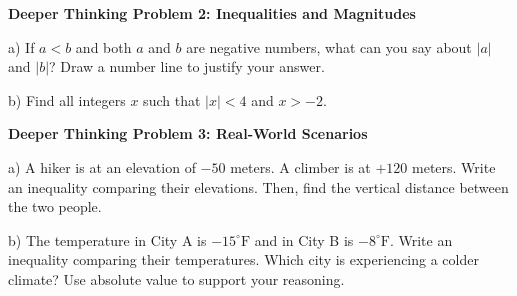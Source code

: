 \documentclass[12pt, letterpaper, fleqn]{article}
\begin{document}
\vspace{4mm}

\begin{tcolorbox}[colback=white, colframe=black, boxrule=1pt, arc=4mm, left=6mm, right=6mm, top=5mm, bottom=5mm]
\textbf{Deeper Thinking Problem 2: Inequalities and Magnitudes}

\medskip

\noindent
a) If $a < b$ and both $a$ and $b$ are negative numbers, what can you say about $|a|$ and $|b|$? Draw a number line to justify your answer.

\vspace{2.5cm}

\noindent
b) Find all integers $x$ such that $|x| < 4$ and $x > -2$.

\vspace{2cm}
\end{tcolorbox}


\begin{tcolorbox}[colback=white, colframe=black, boxrule=1pt, arc=4mm, left=6mm, right=6mm, top=5mm, bottom=5mm]
\textbf{Deeper Thinking Problem 3: Real-World Scenarios}

\medskip

\noindent
a) A hiker is at an elevation of $-50$ meters. A climber is at $+120$ meters. Write an inequality comparing their elevations. Then, find the vertical distance between the two people.

\vspace{4cm}

\noindent
b) The temperature in City A is $-15^\circ\text{F}$ and in City B is $-8^\circ\text{F}$. Write an inequality comparing their temperatures. Which city is experiencing a colder climate? Use absolute value to support your reasoning.

\vspace{4cm}
\end{tcolorbox}
\end{document}
